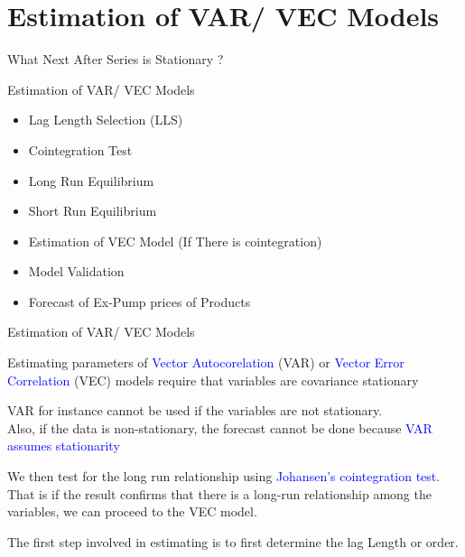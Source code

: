 \documentclass{beamer}
\newcommand{\vspaceFive}{\vspace{5pt}}
\newcommand{\textHighlight}[1]{\textcolor{blue}{#1}}
\newcommand{\VARHighlight}{\textHighlight{Vector Autocorelation }}
\newcommand{\VECHighlight}{\textHighlight{Vector Error Correlation }}
\begin{document}
	\section{Estimation of VAR/ VEC Models}
	\begin{frame}{What Next After Series is Stationary ?}
		
		\begin{block}{Estimation of VAR/ VEC Models}
			\vspaceFive
			\begin{itemize}[label=$\diamond$, leftmargin=2em, itemsep=1em]
				\item Lag Length Selection (LLS)
				\item Cointegration Test
				\item Long Run Equilibrium
				\item Short Run Equilibrium
				\item Estimation of VEC Model (If There is cointegration)
				\item Model Validation
				\item Forecast of Ex-Pump prices of Products
			\end{itemize}
			\vspaceFive
		\end{block}
		
	\end{frame}
	
	
	
	\begin{frame}{Estimation of VAR/ VEC Models}
		\begin{block}{}
			Estimating parameters of \VARHighlight (VAR) or \VECHighlight (VEC) models require that variables are 
			covariance stationary \vspaceFive
		\end{block} \vspaceFive
		
		\begin{block}{}
			VAR for instance cannot be used if the variables are not stationary. \\
			Also, if the data is non-stationary, the forecast cannot be done because \textHighlight{VAR assumes stationarity}
		\end{block}
		
		\begin{block}{}
			We then test for the long run relationship using \textHighlight{Johansen’s cointegration test}.  \\
			That is if the result confirms that there is a long-run relationship among the variables, 
			we can proceed to the VEC model. 
		\end{block}
		
		\begin{exampleblock}{}
			The first step involved in estimating is to first determine the lag Length or order. 
		\end{exampleblock}
	\end{frame}
	
\end{document}

